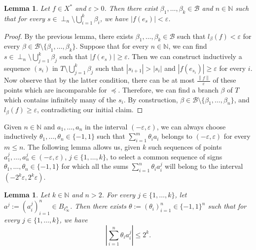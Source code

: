 \documentclass[11pt,a4paper,reqno]{amsart}
\numberwithin{equation}{section}
\newcommand{\abs}[1]{\left\lvert#1\right\rvert}
\newcommand{\norm}[1]{\left\lVert#1\right\rVert}
\newcommand{\N}{\mathbb{N}}
\newcommand{\B}{\mathcal{B}}
\newcommand{\eps}{\varepsilon}
\newcommand{\1}{\mathbbm{1}}
\renewcommand{\geq}{\geqslant}
\renewcommand{\leq}{\leqslant}
\theoremstyle{plain}
\newtheorem{lemma}[theorem]{Lemma}
\theoremstyle{definition}
\begin{document}
\begin{lemma}\label{lem:functionals_have_small_values_on_a_big_part_of_the_tree}
Let $f\in X^*$ and $\varepsilon>0$. Then there exist $\beta_1,\dots,\beta_k\in \B$ and $n\in\N$ such that for every $s\in \perp_n \setminus \bigcup_{i=1}^k \beta_i$, we have $|f(e_s)|<\varepsilon$.
\end{lemma}

\begin{proof}
By the previous lemma, there exists $\beta_1,\dots,\beta_k\in \B$ such that $l_\beta(f)<\varepsilon$ for every $\beta\in\B\setminus\{\beta_1,\dots,\beta_k\}$. Suppose that for every $n\in\N$, we can find $s\in \perp_n \setminus \bigcup_{j=1}^k \beta_j$ such that $\abs{f(e_s)}\geq\varepsilon$. Then we can construct inductively a sequence $(s_i)$ in $T\setminus \bigcup_{j=1}^k \beta_j$ such that $\abs{s_{i+1}}>\abs{s_i}$ and $\abs{f(e_{s_i})}\geq\varepsilon$ for every $i$. Now observe that by the latter condition, there can be at most $\frac{\norm{f}}{\eps}$ of these points which are incomparable for $\preceq$. Therefore, we can find a branch $\beta$ of $T$ which contains infinitely many of the $s_i$. By construction, $\beta\in\B\setminus\{\beta_1,\dots,\beta_n\}$, and $l_\beta(f)\geq \eps$, contradicting our initial claim. 
\end{proof}

Given $n\in\N$ and $a_1,\dots,a_n$ in the interval $(-\eps,\eps)$, we can always choose inductively $\theta_1,\dots,\theta_n\in\{-1,1\}$ such that $\sum_{i=1}^m\theta_ia_i$ belongs to $(-\eps,\eps)$ for every $m\leq n$. The following lemma allows us, given $k$ such sequences of points $a_1^j,\dots,a_n^j\in(-\eps,\eps)$, $j\in\{1,\dots,k\}$, to select a common sequence of signs $\theta_1,\dots,\theta_n\in\{-1,1\}$ for which all the sums $\sum_{i=1}^n\theta_ia_i^j$ will belong to the interval $(-2^k\eps,2^k\eps)$.
\begin{lemma}\label{lem:Jaani_lemma}
    Let $k\in\N$ and $n>2$. For every $j\in\{1,\dots,k\}$, let $a^j:=(a_i^j)_{i=1}^n\in B_{\ell_\infty^n}$. Then there exists $\theta:=(\theta_i)_{i=1}^n\in\{-1,1\}^n$ such that for every $j\in\{1,\dots,k\}$, we have \begin{equation*}
        \abs{\sum_{i=1}^n\theta_ia^j_i}\leq 2^k.
    \end{equation*}
\end{lemma}
\end{document}
